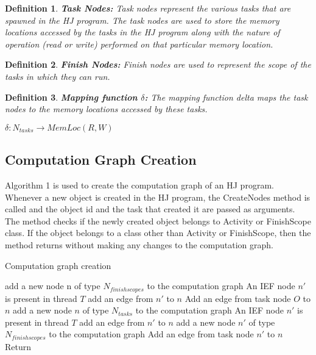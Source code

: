 \documentclass[10pt]{article}
\newtheorem{definition}{Definition}
\begin{document}
\begin{definition}
\textbf{Task Nodes:} Task nodes represent the various tasks that are spawned in the HJ program. The task nodes are used to store the memory locations accessed by the tasks in the HJ program along with the nature of operation (read or write) performed on that particular memory location. 
\end{definition}

\begin{definition}
\textbf{Finish Nodes:} Finish nodes are used to represent the scope of the tasks in which they can run. 
\end{definition}

\begin{definition}
\textbf{Mapping function $\delta$:}
The mapping function delta maps the task nodes to the memory locations accessed by these tasks.
\begin{center}
$\delta : N_{tasks} \longrightarrow MemLoc(R, W)$
\end{center}
\end{definition}

\subsection{Computation Graph Creation}
Algorithm 1 is used to create the computation graph of an HJ program. Whenever a new object is created in the HJ program, the CreateNodes method is called and the object id and the task that created it are passed as arguments. The method checks if the newly created object belongs to Activity or FinishScope class. If the object belongs to a class other than Activity or FinishScope, then the method returns without making any changes to the computation graph.

\begin{algorithm}[h]
\caption{Computation graph creation}
\begin{algorithmic}
		\State add a new node n of type $N_{finishscopes}$ to the computation graph
		\If An IEF node $n'$ is present in thread $T$
			\State add an edge from $n'$ to $n$
		\Else  
		\State Add an edge from task node $O$ to $n$
		\EndIf
		\State add a new node $n$ of type $N_{tasks}$ to the computation graph
		\If An IEF node $n'$ is present in thread $T$
			\State add an edge from $n'$ to $n$
		\Else 
			\State add a new node $n'$ of type $N_{finishscopes}$ to the computation graph 
			\State Add an edge from task node $n'$ to $n$
		\EndIf
	\Else	
		\State Return
	\EndIf
\EndFunction
\end{algorithmic}
\end{algorithm}
\end{document}
